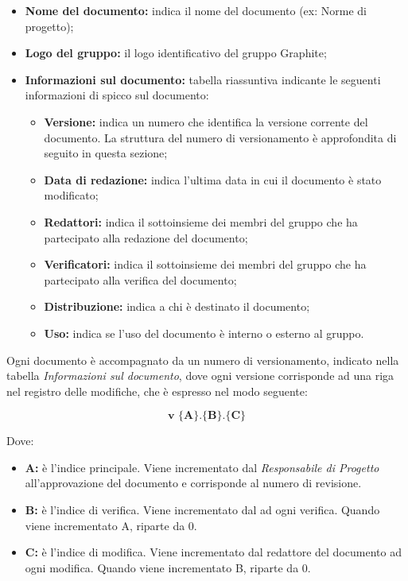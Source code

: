 \documentclass[../NormediProgetto.tex]{subfiles}
\begin{document}
\begin{itemize}
    \item \textbf{Nome del documento:} indica il nome del documento (ex: Norme di progetto);
    \item \textbf{Logo del gruppo:} il logo identificativo del gruppo Graphite;
    \item \textbf{Informazioni sul documento:} tabella riassuntiva indicante le seguenti informazioni di spicco sul documento:
        \begin{itemize}
            \item \textbf{Versione:} indica un numero che identifica la versione corrente del documento. La struttura del numero di versionamento è approfondita di seguito in questa sezione;
            \item \textbf{Data di redazione:} indica l'ultima data in cui il documento è stato modificato;
            \item \textbf{Redattori:} indica il sottoinsieme dei membri del gruppo che ha partecipato alla redazione del documento;
            \item \textbf{Verificatori:} indica il sottoinsieme dei membri del gruppo che ha partecipato alla verifica del documento;
            \item \textbf{Distribuzione:} indica a chi è destinato il documento;
            \item \textbf{Uso:} indica se l'uso del documento è interno o esterno al gruppo.
        \end{itemize}
        
\end{itemize}

Ogni documento è accompagnato da un numero di versionamento, indicato nella tabella \textit{Informazioni sul documento}, dove ogni versione corrisponde ad una riga nel registro delle modifiche, che è espresso nel modo seguente:

\[\textbf{v $\biggl\{$A$\biggr\}$.$\biggl\{$B$\biggr\}$.$\biggl\{$C$\biggr\}$}\]

Dove:

\begin{itemize}
    \item{\textbf{A:}} è l'indice principale. Viene incrementato dal \textit{Responsabile di Progetto} all’approvazione del documento e 
    corrisponde al numero di revisione.
    \item{\textbf{B:}} è l'indice di verifica. Viene incrementato dal  ad ogni verifica. Quando viene incrementato A, riparte da 0.
    \item{\textbf{C:}} è l'indice di modifica. Viene incrementato dal redattore del documento ad ogni modifica. Quando viene incrementato B, riparte da 0.
\end{itemize}
\end{document}
